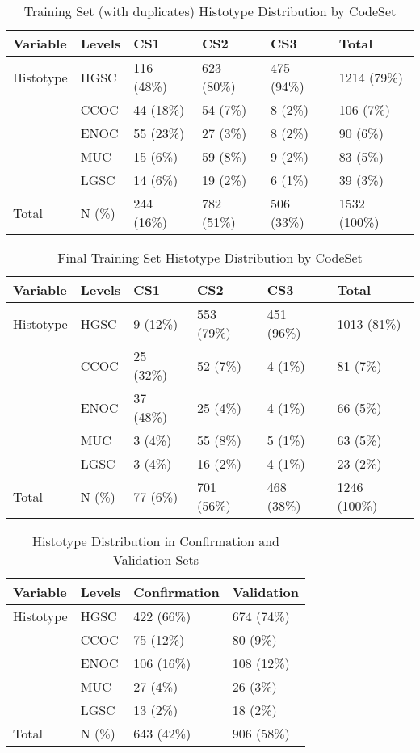 \documentclass[
]{report}
\begin{document}
\begin{table}

\caption{\label{tab:train-all-hist-codeset}Training Set (with duplicates) Histotype Distribution by CodeSet}
\centering
\begin{tabular}[t]{l|l|l|l|l|l}
\hline
Variable & Levels & CS1 & CS2 & CS3 & Total\\
\hline
Histotype & HGSC & 116 (48\%) & 623 (80\%) & 475 (94\%) & 1214 (79\%)\\
\hline
 & CCOC & 44 (18\%) & 54 (7\%) & 8 (2\%) & 106 (7\%)\\
\hline
 & ENOC & 55 (23\%) & 27 (3\%) & 8 (2\%) & 90 (6\%)\\
\hline
 & MUC & 15 (6\%) & 59 (8\%) & 9 (2\%) & 83 (5\%)\\
\hline
 & LGSC & 14 (6\%) & 19 (2\%) & 6 (1\%) & 39 (3\%)\\
\hline
Total & N (\%) & 244 (16\%) & 782 (51\%) & 506 (33\%) & 1532 (100\%)\\
\hline
\end{tabular}
\end{table}

\begin{table}

\caption{\label{tab:train-hist-codeset}Final Training Set Histotype Distribution by CodeSet}
\centering
\begin{tabular}[t]{l|l|l|l|l|l}
\hline
Variable & Levels & CS1 & CS2 & CS3 & Total\\
\hline
Histotype & HGSC & 9 (12\%) & 553 (79\%) & 451 (96\%) & 1013 (81\%)\\
\hline
 & CCOC & 25 (32\%) & 52 (7\%) & 4 (1\%) & 81 (7\%)\\
\hline
 & ENOC & 37 (48\%) & 25 (4\%) & 4 (1\%) & 66 (5\%)\\
\hline
 & MUC & 3 (4\%) & 55 (8\%) & 5 (1\%) & 63 (5\%)\\
\hline
 & LGSC & 3 (4\%) & 16 (2\%) & 4 (1\%) & 23 (2\%)\\
\hline
Total & N (\%) & 77 (6\%) & 701 (56\%) & 468 (38\%) & 1246 (100\%)\\
\hline
\end{tabular}
\end{table}

\begin{table}

\caption{\label{tab:hist-conf-val}Histotype Distribution in Confirmation and Validation Sets}
\centering
\begin{tabular}[t]{l|l|l|l}
\hline
Variable & Levels & Confirmation & Validation\\
\hline
Histotype & HGSC & 422 (66\%) & 674 (74\%)\\
\hline
 & CCOC & 75 (12\%) & 80 (9\%)\\
\hline
 & ENOC & 106 (16\%) & 108 (12\%)\\
\hline
 & MUC & 27 (4\%) & 26 (3\%)\\
\hline
 & LGSC & 13 (2\%) & 18 (2\%)\\
\hline
Total & N (\%) & 643 (42\%) & 906 (58\%)\\
\hline
\end{tabular}
\end{table}
\end{document}
